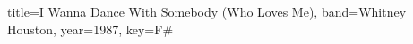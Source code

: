\documentclass{bekki-leadsheet}
\begin{document}
\begin{song}{title={I Wanna Dance With Somebody (Who Loves Me)}, band={Whitney Houston}, year={1987}, key={F#}}



\end{song}
\end{document}
